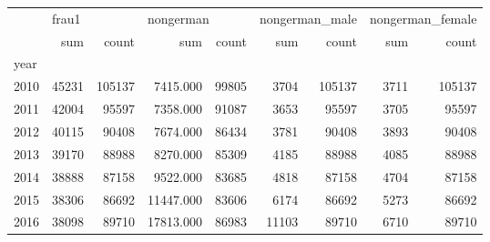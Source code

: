 \begin{tabular}{lrrrrrrrr}
\toprule
{} & \multicolumn{2}{l}{frau1} & \multicolumn{2}{l}{nongerman} & \multicolumn{2}{l}{nongerman\_male} & \multicolumn{2}{l}{nongerman\_female} \\
{} &    sum &   count &       sum &  count &            sum &   count &              sum &   count \\
year &        &         &           &        &                &         &                  &         \\
\midrule
2010 &  45231 &  105137 &  7415.000 &  99805 &           3704 &  105137 &             3711 &  105137 \\
2011 &  42004 &   95597 &  7358.000 &  91087 &           3653 &   95597 &             3705 &   95597 \\
2012 &  40115 &   90408 &  7674.000 &  86434 &           3781 &   90408 &             3893 &   90408 \\
2013 &  39170 &   88988 &  8270.000 &  85309 &           4185 &   88988 &             4085 &   88988 \\
2014 &  38888 &   87158 &  9522.000 &  83685 &           4818 &   87158 &             4704 &   87158 \\
2015 &  38306 &   86692 & 11447.000 &  83606 &           6174 &   86692 &             5273 &   86692 \\
2016 &  38098 &   89710 & 17813.000 &  86983 &          11103 &   89710 &             6710 &   89710 \\
\bottomrule
\end{tabular}
